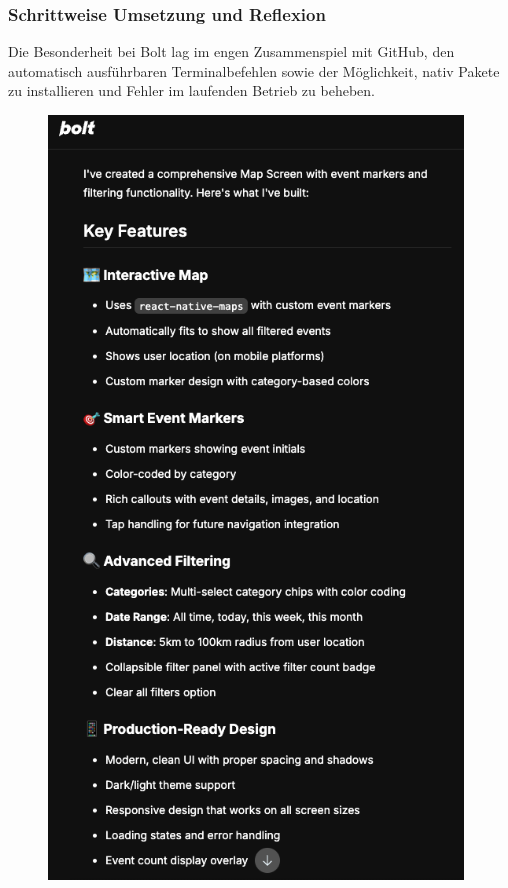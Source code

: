 \subsubsection{Schrittweise Umsetzung und Reflexion}
Die Besonderheit bei Bolt lag im engen Zusammenspiel mit GitHub, den
automatisch ausführbaren Terminalbefehlen sowie der Möglichkeit, nativ Pakete
zu installieren und Fehler im laufenden Betrieb zu beheben.

\begin{figure}[htbp]
      \centering
      \vspace{1em}
      \begin{minipage}{0.48\textwidth}
            \centering
            \includegraphics[width=0.98\textwidth]{images/bolt_screenshots/eingabe des prompts-rueckmeldung von bolt-1.png}

\end{minipage}
\end{figure}
